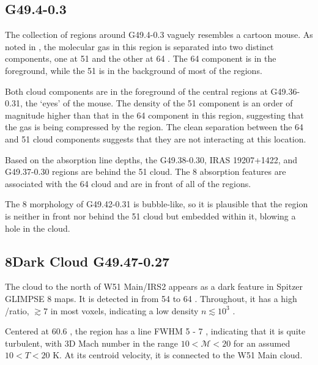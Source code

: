 \subsection{G49.4-0.3}
\label{sec:maus}
The collection of \hii regions around G49.4-0.3 vaguely resembles a cartoon
mouse.  As noted in \citet{Carpenter1998a}, the molecular gas in this region is
separated into two distinct components, one at 51 \kms and the other at 64
\kms.  The 64 \kms component is in the foreground, while the 51 \kms is in the
background of most of the \hii regions.  

Both cloud components are in the foreground of the central \hii regions at
G49.36-0.31, the `eyes' of the mouse.  The density of the 51 \kms component is
an order of magnitude higher than that in the 64 \kms component in this region,
suggesting that the gas is being compressed by the \hii region.
The clean separation between the 64 and 51 \kms cloud components suggests that
they are not interacting at this location.  

Based on the absorption line depths, the G49.38-0.30, IRAS 19207+1422, and
G49.37-0.30 \hii regions are behind the 51 \kms cloud.  The 8 \um absorption
features are associated with the 64 \kms cloud and are in front of all of the
\hii regions.

The 8 \um morphology of G49.42-0.31 is bubble-like, so it is plausible that the
\hii region is neither in front nor behind the 51 \kms cloud but embedded
within it, blowing a hole in the cloud.

\subsection{8\um Dark Cloud G49.47-0.27}
The cloud to the north of W51 Main/IRS2 appears as a dark feature in Spitzer
GLIMPSE 8 \um maps.  It is detected in \formaldehyde from 54 to 64
\kms.  Throughout, it has a high \oneone/\twotwo ratio, $\gtrsim7$ in
most voxels, indicating a low density $n\lesssim10^3$ \percc. 


Centered at 60.6 \kms, the region has a line FWHM 5 - 7 \kms, indicating that
it is quite turbulent, with 3D Mach number in the range $10 < \mathcal{M} < 20$
for an assumed $10 < T < 20$ K.  At its centroid velocity, it is connected
to the W51 Main cloud.

